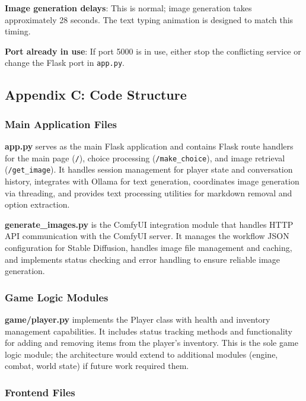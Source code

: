 \documentclass[12pt,a4paper]{article}
\begin{document}
    \textbf{Image generation delays}: This is normal; image generation takes approximately 28 seconds. The text typing animation is designed to match this timing.

    \textbf{Port already in use}: If port 5000 is in use, either stop the conflicting service or change the Flask port in \texttt{app.py}.

\subsection*{Appendix C: Code Structure}

    \subsubsection*{Main Application Files}

    \textbf{app.py} serves as the main Flask application and contains Flask route handlers for the main page (\texttt{/}), choice processing (\texttt{/make\_choice}), and image retrieval (\texttt{/get\_image}). It handles session management for player state and conversation history, integrates with Ollama for text generation, coordinates image generation via threading, and provides text processing utilities for markdown removal and option extraction.

    \textbf{generate\_images.py} is the ComfyUI integration module that handles HTTP API communication with the ComfyUI server. It manages the workflow JSON configuration for Stable Diffusion, handles image file management and caching, and implements status checking and error handling to ensure reliable image generation.

    \subsubsection*{Game Logic Modules}

\textbf{game/player.py} implements the Player class with health and inventory management capabilities. It includes status tracking methods and functionality for adding and removing items from the player's inventory. This is the sole game logic module; the architecture would extend to additional modules (engine, combat, world state) if future work required them.

    \subsubsection*{Frontend Files}
\end{document}
